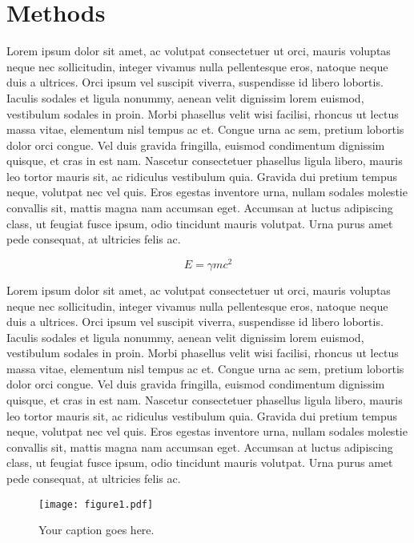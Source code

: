 \documentclass[twocolumn,prb,amsmath,amssymb,amsfonts]{revtex4}
\begin{document}
\section{Methods}
Lorem ipsum dolor sit amet, ac volutpat consectetuer ut orci, mauris voluptas neque nec sollicitudin, integer vivamus nulla pellentesque eros, natoque neque duis a ultrices. Orci ipsum vel suscipit viverra, suspendisse id libero lobortis. Iaculis sodales et ligula nonummy, aenean velit dignissim lorem euismod, vestibulum sodales in proin. Morbi phasellus velit wisi facilisi, rhoncus ut lectus massa vitae, elementum nisl tempus ac et. Congue urna ac sem, pretium lobortis dolor orci congue. Vel duis gravida fringilla, euismod condimentum dignissim quisque, et cras in est nam. Nascetur consectetuer phasellus ligula libero, mauris leo tortor mauris sit, ac ridiculus vestibulum quia. Gravida dui pretium tempus neque, volutpat nec vel quis. Eros egestas inventore urna, nullam sodales molestie convallis sit, mattis magna nam accumsan eget. Accumsan at luctus adipiscing class, ut feugiat fusce ipsum, odio tincidunt mauris volutpat. Urna purus amet pede consequat, at ultricies felis ac.

\begin{equation}
E=\gamma mc^{2}
\end{equation}

Lorem ipsum dolor sit amet, ac volutpat consectetuer ut orci, mauris voluptas neque nec sollicitudin, integer vivamus nulla pellentesque eros, natoque neque duis a ultrices. Orci ipsum vel suscipit viverra, suspendisse id libero lobortis. Iaculis sodales et ligula nonummy, aenean velit dignissim lorem euismod, vestibulum sodales in proin. Morbi phasellus velit wisi facilisi, rhoncus ut lectus massa vitae, elementum nisl tempus ac et. Congue urna ac sem, pretium lobortis dolor orci congue. Vel duis gravida fringilla, euismod condimentum dignissim quisque, et cras in est nam. Nascetur consectetuer phasellus ligula libero, mauris leo tortor mauris sit, ac ridiculus vestibulum quia. Gravida dui pretium tempus neque, volutpat nec vel quis. Eros egestas inventore urna, nullam sodales molestie convallis sit, mattis magna nam accumsan eget. Accumsan at luctus adipiscing class, ut feugiat fusce ipsum, odio tincidunt mauris volutpat. Urna purus amet pede consequat, at ultricies felis ac.

\begin{figure}
\texttt{[image: figure1.pdf]}
\caption{Your caption goes here.}
\end{figure}
\end{document}
